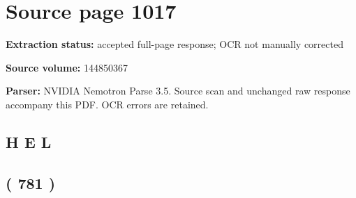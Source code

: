 \clearpage
\section{Source page 1017}
\textbf{Extraction status:} accepted full-page response; OCR not manually corrected\par
\textbf{Source volume:} 144850367\par
\textbf{Parser:} NVIDIA Nemotron Parse 3.5. Source scan and unchanged raw response accompany this PDF. OCR errors are retained.\par\medskip
\subsection*{H E L}
\subsection*{( 781 )}
